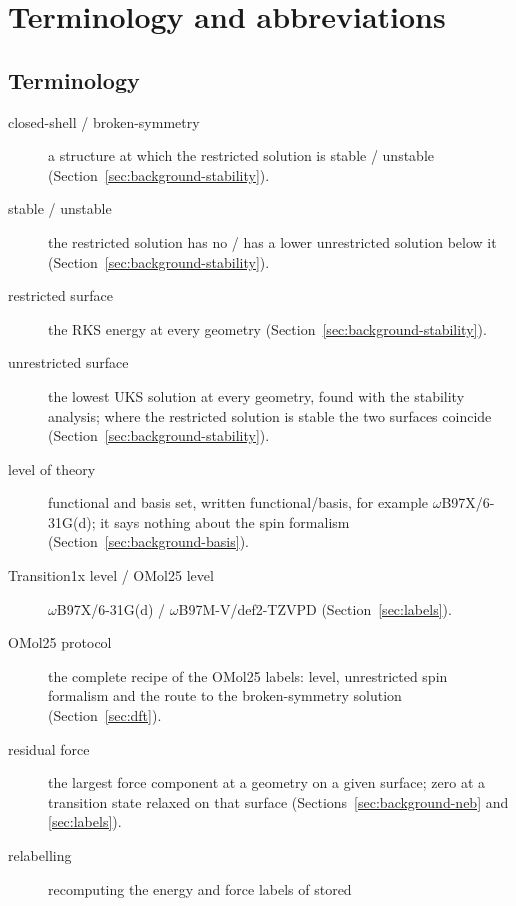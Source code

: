 
\section*{Terminology and abbreviations}

\subsection*{Terminology}

\begin{description}
  \item[closed-shell / broken-symmetry] a structure at which the
    restricted solution is stable / unstable
    (Section~\ref{sec:background-stability}).
  \item[stable / unstable] the restricted solution has no / has a lower
    unrestricted solution below it
    (Section~\ref{sec:background-stability}).
  \item[restricted surface] the RKS energy at every geometry
    (Section~\ref{sec:background-stability}).
  \item[unrestricted surface] the lowest UKS solution at every geometry,
    found with the stability analysis; where the restricted solution is
    stable the two surfaces coincide
    (Section~\ref{sec:background-stability}).
  \item[level of theory] functional and basis set, written
    functional/basis, for example \mbox{$\omega$B97X/6-31G(d)}; it says
    nothing about the spin formalism (Section~\ref{sec:background-basis}).
  \item[Transition1x level / OMol25 level] \mbox{$\omega$B97X/6-31G(d)}
    / \mbox{$\omega$B97M-V/def2-TZVPD} (Section~\ref{sec:labels}).
  \item[OMol25 protocol] the complete recipe of the OMol25 labels:
    level, unrestricted spin formalism and the route to the
    broken-symmetry solution (Section~\ref{sec:dft}).
  \item[residual force] the largest force component at a geometry on a
    given surface; zero at a transition state relaxed on that surface
    (Sections~\ref{sec:background-neb} and \ref{sec:labels}).
  \item[relabelling] recomputing the energy and force labels of stored

\end{description}

